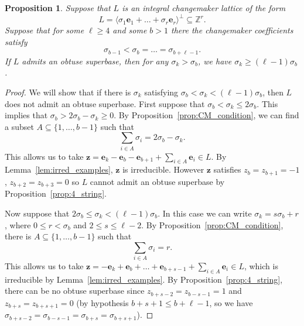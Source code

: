 \documentclass{amsart} %
\newcommand{\Z}{\mathbb{Z}}
\newcommand{\e}{\bm{e}}
\theoremstyle{thm}
\newtheorem{prop}[Theorem]{Proposition}
\theoremstyle{definition}
\numberwithin{equation}{section}
\begin{document}
\begin{prop}\label{prop:long_string_obs}
Suppose that $L$ is an integral changemaker lattice of the form
\[
L=\langle \sigma_1 \e_1+ \dots+ \sigma_r \e_r\rangle^\bot\subseteq \Z^r.
\]
Suppose that for some $\ell\geq 4$ and some $b>1$ there the changemaker coefficients satisfy
\[
\sigma_{b-1}<\sigma_{b}= \dots = \sigma_{b+\ell-1}.
\]
If $L$ admits an obtuse superbase, then for any $\sigma_k>\sigma_{b}$, we have $\sigma_{k}\geq (\ell-1) \sigma_{b}$.
\end{prop}
\begin{proof}
We will show that if there is $\sigma_k$ satisfying $\sigma_{b}<\sigma_{k}<(\ell-1) \sigma_{b}$, then $L$ does not admit an obtuse superbase. First suppose that $\sigma_b <\sigma_{k}\leq 2\sigma_b$. This implies that $\sigma_b>2\sigma_b - \sigma_{k}\geq 0$. By Proposition~\ref{prop:CM_condition}, we can find a subset $A\subseteq \{1, \dots, b-1\}$ such that
\[
\sum_{i \in A} \sigma_i = 2\sigma_b - \sigma_{k}.
\]
This allows us to take $\bm{z}=\e_{k}-\e_b -\e_{b+1} + \sum_{i\in A} \e_i\in L$. By Lemma~\ref{lem:irred_examples}, $\bm{z}$ is irreducible. However $\bm{z}$ satisfies $z_{b}=z_{b+1}=-1$, $z_{b+2}=z_{b+3}=0$ so $L$ cannot admit an obtuse superbase by Proposition~\ref{prop:4_string}.

Now suppose that $2\sigma_b \leq \sigma_{k}<(\ell-1)\sigma_b$. In this case we can write $\sigma_{k}= s\sigma_b + r$, where $0\leq r < \sigma_b$ and $2\leq s\leq \ell-2$. By Proposition~\ref{prop:CM_condition}, there is $A\subseteq \{1, \dots, b-1\}$ such that
\[
\sum_{i \in A} \sigma_i = r.
\]
This allows us to take $\bm{z}=-\e_{k}+ \e_b+ \dots + \e_{b+s-1}+\sum_{i\in A} \e_i\in L$, which is irreducible by Lemma~\ref{lem:irred_examples}. By Proposition~\ref{prop:4_string}, there can be no obtuse superbase since $z_{b+s-2}=z_{b-s-1}=1$ and $z_{b+s}=z_{b+s+1}=0$ (by hypothesis $b+s+1\leq b+\ell-1$, so we have $\sigma_{b+s-2}=\sigma_{b-s-1}=\sigma_{b+s}=\sigma_{b+s+1}$).
\end{proof}
\end{document}
